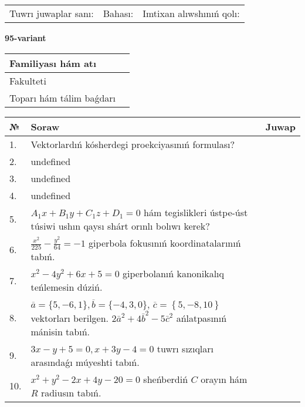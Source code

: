 \documentclass{article}
\begin{document}
\vspace{0.7cm}

\begin{tabular}{lll}
Tuwrı juwaplar sanı: \underline{\hspace{1cm}} & 
Bahası: \underline{\hspace{1cm}} & 
Imtixan alıwshınıń qolı: \underline{\hspace{2cm}} \\
\end{tabular}

\egroup

\newpage


\textbf{95-variant}\\

\bgroup
\def\arraystretch{1.6} %

\begin{tabular}{|m{5.7cm}|m{9.5cm}|}
\hline
Familiyası hám atı & \\
\hline
Fakulteti  & \\
\hline
Toparı hám tálim baǵdarı  & \\
\hline
\end{tabular}

\vspace{0.7cm}

\begin{tabular}{|m{0.7cm}|m{10cm}|m{4cm}|}
\hline
№ & Soraw & Juwap \\
\hline
1. & Vektorlardıń kósherdegi proekciyasınıń formulası? &  \\
\hline
2. & undefined &  \\
\hline
3. & undefined &  \\
\hline
4. & undefined &  \\
\hline
5. & \(A_{1}x + B_{1}y + C_{1}z + D_{1} = 0\) hám tegislikleri ústpe-úst túsiwi ushın qaysı shárt orınlı bolıwı kerek? &  \\
\hline
6. & \(\frac{x^{2}}{225} - \frac{y^{2}}{64} = - 1\) giperbola fokusınıń koordinatalarınıń tabıń. &  \\
\hline
7. & \(x^{2} - 4 y^{2} + 6 x + 5 = 0\) giperbolanıń kanonikalıq teńlemesin dúziń. &  \\
\hline
8. & \(\overline{a} = \{5,- 6, 1 \}, \overline{b} = \{ - 4, 3, 0 \} \), \(\overline{c} = \left\{ 5,- 8, 10 \right\}\) vektorları berilgen. \(2{\bar{a}}^{2} + 4{\bar{b}}^{2} - 5{\bar{c}}^{2}\) ańlatpasınıń mánisin tabıń. &  \\
\hline
9. & \(3 x - y + 5 = 0, x + 3 y - 4 = 0\) tuwrı sızıqları arasındaǵı múyeshti tabıń. &  \\
\hline
10. & \(x^{2} + y^{2} - 2 x + 4 y - 20 = 0\) sheńberdiń \(C\) orayın hám \(R\) radiusın tabıń. & \\
\hline
\end{tabular}
\end{document}
